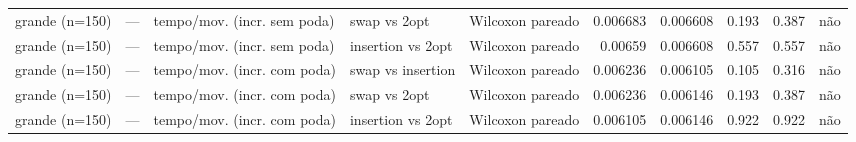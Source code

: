 \begin{table}[ht]
\begin{tabular}{lllllrrrrl}
grande (n=150) & — & tempo/mov. (incr. sem poda) & swap vs 2opt & Wilcoxon pareado & 0.006683 & 0.006608 & 0.193 & 0.387 & não \\
grande (n=150) & — & tempo/mov. (incr. sem poda) & insertion vs 2opt & Wilcoxon pareado & 0.00659 & 0.006608 & 0.557 & 0.557 & não \\
grande (n=150) & — & tempo/mov. (incr. com poda) & swap vs insertion & Wilcoxon pareado & 0.006236 & 0.006105 & 0.105 & 0.316 & não \\
grande (n=150) & — & tempo/mov. (incr. com poda) & swap vs 2opt & Wilcoxon pareado & 0.006236 & 0.006146 & 0.193 & 0.387 & não \\
grande (n=150) & — & tempo/mov. (incr. com poda) & insertion vs 2opt & Wilcoxon pareado & 0.006105 & 0.006146 & 0.922 & 0.922 & não \\
\hline
\end{tabular}
\end{table}
